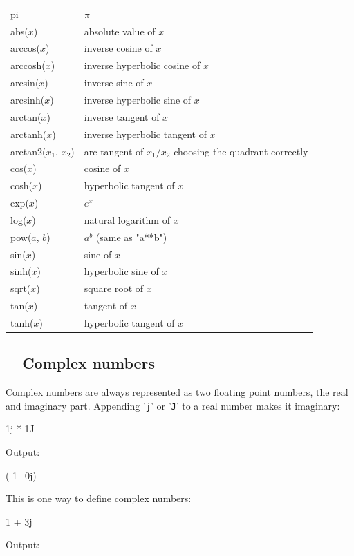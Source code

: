 \begin{center}
\begin{tabular}{|l|l|}
\hline
pi &  $\pi$\\
abs($x$) &  absolute value of $x$\\
arccos($x$) &  inverse cosine of $x$ \\
arccosh($x$) &  inverse hyperbolic cosine of $x$ \\
arcsin($x$) & inverse sine of $x$ \\
arcsinh($x$) & inverse hyperbolic sine of $x$ \\
arctan($x$) & inverse tangent of $x$ \\
arctanh($x$) & inverse hyperbolic tangent of $x$ \\
arctan2($x_1$, $x_2$) & arc tangent of $x_1/x_2$ choosing the quadrant correctly \\
cos($x$) & cosine of $x$ \\
cosh($x$) & hyperbolic tangent of $x$ \\
exp($x$) & $e^x$ \\
log($x$) & natural logarithm of $x$ \\
pow($a$, $b$) & $a^b$ (same as "a**b")\\
sin($x$) & sine of $x$ \\
sinh($x$) & hyperbolic sine of $x$ \\
sqrt($x$) & square root of $x$ \\
tan($x$) & tangent of $x$\\
tanh($x$) & hyperbolic tangent of $x$ \\
\hline
\end{tabular}
\end{center}
\vspace{4mm}
\noindent

\subsection{\ \ Complex numbers}
Complex numbers are always represented as two floating point numbers, the 
real and imaginary part. Appending '{\tt j}' or  '{\tt J}' to a real number
makes it imaginary:

\begin{bluecode}
1j * 1J
\end{bluecode}
Output:

\begin{greencode}
(-1+0j)
\end{greencode}
This is one way to define complex numbers:
\begin{bluecode}
1 + 3j
\end{bluecode}
Output:

